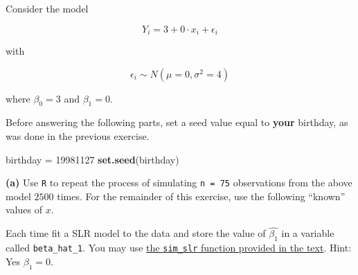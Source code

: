 \documentclass[]{article}
\newenvironment{Shaded}{\begin{snugshade}}{\end{snugshade}}
\newcommand{\KeywordTok}[1]{\textcolor[rgb]{0.13,0.29,0.53}{\textbf{#1}}}
\newcommand{\DataTypeTok}[1]{\textcolor[rgb]{0.13,0.29,0.53}{#1}}
\newcommand{\DecValTok}[1]{\textcolor[rgb]{0.00,0.00,0.81}{#1}}
\newcommand{\StringTok}[1]{\textcolor[rgb]{0.31,0.60,0.02}{#1}}
\newcommand{\ControlFlowTok}[1]{\textcolor[rgb]{0.13,0.29,0.53}{\textbf{#1}}}
\newcommand{\OperatorTok}[1]{\textcolor[rgb]{0.81,0.36,0.00}{\textbf{#1}}}
\newcommand{\NormalTok}[1]{#1}
\begin{document}
Consider the model

\[
Y_i = 3 + 0 \cdot x_i + \epsilon_i
\]

with

\[
\epsilon_i \sim N(\mu = 0, \sigma^2 = 4)
\]

where \(\beta_0 = 3\) and \(\beta_1 = 0\).

Before answering the following parts, set a seed value equal to
\textbf{your} birthday, as was done in the previous exercise.

\begin{Shaded}
\begin{Highlighting}[]
\NormalTok{birthday =}\StringTok{ }\DecValTok{19981127}
\KeywordTok{set.seed}\NormalTok{(birthday)}
\end{Highlighting}
\end{Shaded}

\textbf{(a)} Use \texttt{R} to repeat the process of simulating
\texttt{n\ =\ 75} observations from the above model \(2500\) times. For
the remainder of this exercise, use the following ``known'' values of
\(x\).

\begin{Shaded}
\end{Shaded}

Each time fit a SLR model to the data and store the value of
\(\hat{\beta_1}\) in a variable called \texttt{beta\_hat\_1}. You may
use
\href{http://daviddalpiaz.github.io/appliedstats/simple-linear-regression.html\#simulating-slr}{the
\texttt{sim\_slr} function provided in the text}. Hint: Yes
\(\beta_1 = 0\).
\end{document}
